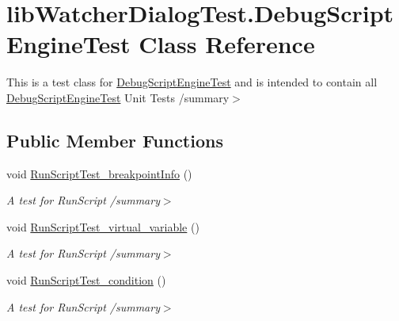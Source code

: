 \hypertarget{classlib_watcher_dialog_test_1_1_debug_script_engine_test}{\section{lib\+Watcher\+Dialog\+Test.\+Debug\+Script\+Engine\+Test Class Reference}
\label{classlib_watcher_dialog_test_1_1_debug_script_engine_test}
}


This is a test class for \hyperlink{classlib_watcher_dialog_test_1_1_debug_script_engine_test}{Debug\+Script\+Engine\+Test} and is intended to contain all \hyperlink{classlib_watcher_dialog_test_1_1_debug_script_engine_test}{Debug\+Script\+Engine\+Test} Unit Tests /summary$>$  


\subsection*{Public Member Functions}
\begin{DoxyCompactItemize}
\item 
\hypertarget{classlib_watcher_dialog_test_1_1_debug_script_engine_test_a38b0cce66c85bf5037bdd7d2f15c58b8}{void \hyperlink{classlib_watcher_dialog_test_1_1_debug_script_engine_test_a38b0cce66c85bf5037bdd7d2f15c58b8}{Run\+Script\+Test\+\_\+breakpoint\+Info} ()}\label{classlib_watcher_dialog_test_1_1_debug_script_engine_test_a38b0cce66c85bf5037bdd7d2f15c58b8}

\begin{DoxyCompactList}\small\item\em A test for Run\+Script /summary$>$ \end{DoxyCompactList}\item 
\hypertarget{classlib_watcher_dialog_test_1_1_debug_script_engine_test_a00072ae9e3adc499079bb52b2cbd9487}{void \hyperlink{classlib_watcher_dialog_test_1_1_debug_script_engine_test_a00072ae9e3adc499079bb52b2cbd9487}{Run\+Script\+Test\+\_\+virtual\+\_\+variable} ()}\label{classlib_watcher_dialog_test_1_1_debug_script_engine_test_a00072ae9e3adc499079bb52b2cbd9487}

\begin{DoxyCompactList}\small\item\em A test for Run\+Script /summary$>$ \end{DoxyCompactList}\item 
\hypertarget{classlib_watcher_dialog_test_1_1_debug_script_engine_test_aff6f66301a272745a755576375b313eb}{void \hyperlink{classlib_watcher_dialog_test_1_1_debug_script_engine_test_aff6f66301a272745a755576375b313eb}{Run\+Script\+Test\+\_\+condition} ()}\label{classlib_watcher_dialog_test_1_1_debug_script_engine_test_aff6f66301a272745a755576375b313eb}

\begin{DoxyCompactList}\small\item\em A test for Run\+Script /summary$>$ \end{DoxyCompactList}\end{DoxyCompactItemize}
